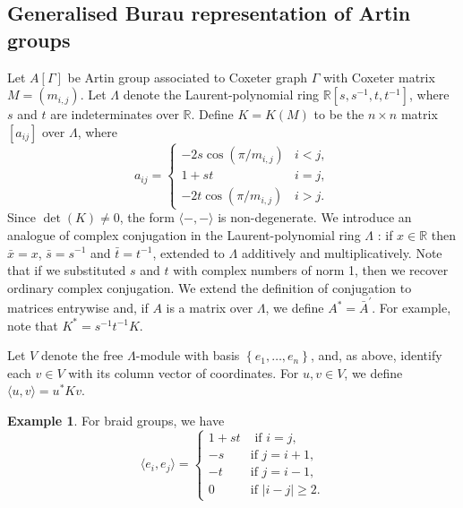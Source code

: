 \documentclass[12pt]{amsart}
\theoremstyle{definition}
\newtheorem{example}[equation]{Example}
\numberwithin{equation}{section}
\begin{document}
\subsection{Generalised Burau representation of Artin groups}
Let $A[\Gamma]$ be Artin group associated to Coxeter graph $\Gamma$ with Coxeter matrix $M=(m_{i,j})$. Let $\Lambda$ denote the Laurent-polynomial ring $\mathbb{R}\left[s, s^{-1}, t, t^{-1}\right]$, where $s$ and $t$ are indeterminates over $\mathbb{R}$. Define $K=K(M)$ to be the $n \times n$ matrix $\left[a_{i j}\right]$ over $\Lambda$, where
$$
a_{i j}= \begin{cases}-2 s \cos (\pi / m_{i, j}) & i<j, \\ 1+s t & i=j, \\ -2 t \cos (\pi / m_{i, j}) & i>j .\end{cases}
$$
Since $\operatorname{det}(K)\neq 0$, the form $\langle - , - \rangle$ is non-degenerate.  We introduce an analogue of complex conjugation in the Laurent-polynomial ring $\Lambda$ : if $x \in \mathbb{R}$ then $\bar{x}=x$, $\bar{s}=s^{-1}$ and $\bar{t}=t^{-1}$, extended to $\Lambda$ additively and multiplicatively. Note that if we substituted $s$ and $t$ with complex numbers of norm 1, then we recover ordinary complex conjugation. We extend the definition of conjugation to matrices entrywise and, if $A$ is a matrix over $\Lambda$, we define $A^*=\bar{A}^{\prime}$. For example, note that $K^*=s^{-1} t^{-1} K$.
\par
Let $V$ denote the free $\Lambda$-module with basis $\left\{e_1, \ldots, e_n\right\}$, and, as above, identify each $v \in V$ with its column vector of coordinates. For $u, v \in V$, we define $\langle u, v\rangle=u^* K v$. 
\begin{example}
For braid groups, we have
$$
\langle e_i, e_j \rangle = \begin{cases}
1+st & \text{ if } i=j, \\
-s & \text {if } j=i+1, \\
-t & \text {if } j=i-1, \\
0 & \text {if } |i-j| \geq 2.
\end{cases}
$$
\end{example}
\end{document}
